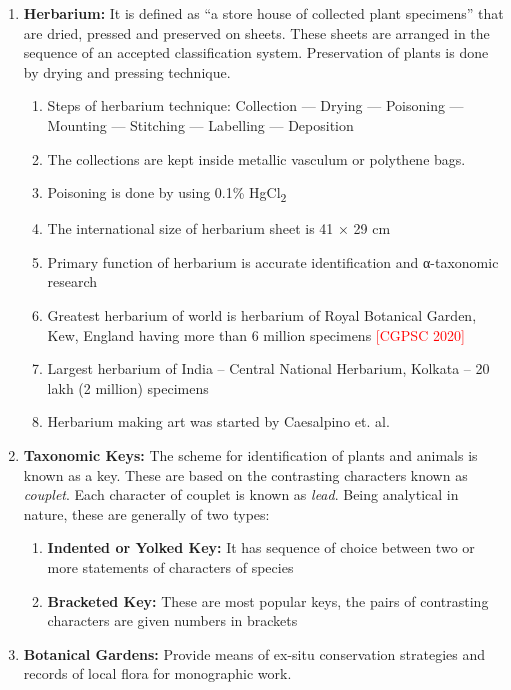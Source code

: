 \documentclass[
]{book}
\providecommand{\tightlist}{%
  \setlength{\itemsep}{0pt}\setlength{\parskip}{0pt}}
\begin{document}
\begin{enumerate}
\def\labelenumi{\arabic{enumi}.}
\item
  \textbf{Herbarium:} It is defined as ``a store house of collected plant specimens'' that are dried, pressed and preserved on sheets. These sheets are arranged in the sequence of an accepted classification system. Preservation of plants is done by drying and pressing technique.

  \begin{enumerate}
  \def\labelenumii{\roman{enumii})}
  \tightlist
  \item
    Steps of herbarium technique: Collection --- Drying --- Poisoning --- Mounting --- Stitching --- Labelling --- Deposition
  \item
    The collections are kept inside metallic vasculum or polythene bags.
  \item
    Poisoning is done by using 0.1\% HgCl\textsubscript{2}
  \item
    The international size of herbarium sheet is 41 × 29 cm
  \item
    Primary function of herbarium is accurate identification and α-taxonomic research
  \item
    Greatest herbarium of world is herbarium of Royal Botanical Garden, Kew, England having more than 6 million specimens \textcolor{red}{[CGPSC 2020]}
  \item
    Largest herbarium of India -- Central National Herbarium, Kolkata -- 20 lakh (2 million) specimens
  \item
    Herbarium making art was started by Caesalpino et. al.
  \end{enumerate}
\item
  \textbf{Taxonomic Keys:} The scheme for identification of plants and animals is known as a key. These are based on the contrasting characters known as \emph{couplet}. Each character of couplet is known as \emph{lead}. Being analytical in nature, these are generally of two types:

  \begin{enumerate}
  \def\labelenumii{\roman{enumii})}
  \tightlist
  \item
    \textbf{Indented or Yolked Key:} It has sequence of choice between two or more statements of characters of species
  \item
    \textbf{Bracketed Key:} These are most popular keys, the pairs of contrasting characters are given numbers in brackets
  \end{enumerate}
\item
  \textbf{Botanical Gardens:} Provide means of ex-situ conservation strategies and records of local flora for monographic work.


\end{enumerate}
\end{document}
